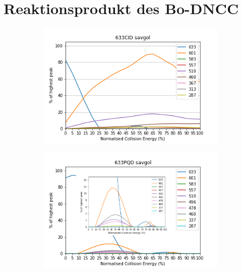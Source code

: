 \pagebreak
\section{Reaktionsprodukt des Bo-DNCC}

\begin{figure}[!htbp]
  \begin{subfigure}[b]{0.5\textwidth}
    \includegraphics[width=\textwidth]{content/Anhang/ESIMS/RP_Bo-DNCC/633CID-633savgol.png}
    \caption{}
  \end{subfigure}
  \hfill
  \begin{subfigure}[b]{0.5\textwidth}
    \includegraphics[width=\textwidth]{content/Anhang/ESIMS/RP_Bo-DNCC/633PQD-633savgol_pic.png}
    \caption{}
  \end{subfigure}
  

\end{figure}
